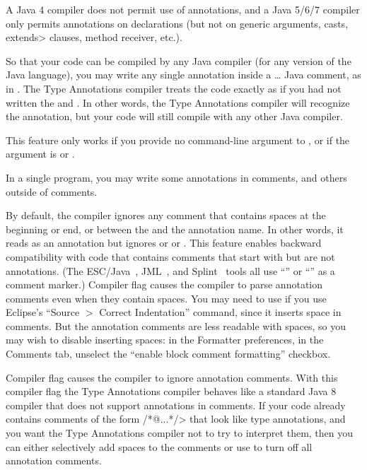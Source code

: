 A Java 4 compiler does not permit use of
annotations, and a Java 5/6/7 compiler only permits annotations on
declarations (but not on generic arguments, casts, \<extends> clauses, method receiver, etc.).

So that your code can be compiled by any Java compiler (for any version of
the Java language), you may write any single annotation inside a
\code{/*}\ldots\code{*/} Java comment, as in .
The Type Annotations compiler treats the code exactly as if you had not written the
\code{/*} and \code{*/}.
In other words, the Type Annotations compiler will recognize the
annotation, but your code will still compile with any other Java compiler.

This feature only works if you provide no  command-line
argument to , or if the  argument is 
or .

In a single program, you may write some annotations in comments, and others
outside of comments.

By default, the compiler ignores any comment that contains spaces at the
beginning or end, or between the  and the annotation name.
In other words, it reads  as an annotation but ignores
 or  or .
This
feature enables backward compatibility with code that contains comments
that start with  but are not annotations.  (The
ESC/Java~\cite{FlanaganLLNSS02}, JML~\cite{LeavensBR2006:JML}, and
Splint~\cite{Evans96} tools all use ``'' or ``'' as a
comment marker.)
Compiler flag
 causes the compiler to parse annotation comments
even when they contain spaces.  You may need to use
 if you use Eclipse's ``Source $>$ Correct
Indentation'' command, since it inserts space in comments.  But the
annotation comments are less readable with spaces, so you may wish to disable
inserting spaces:  in the Formatter preferences, in the Comments tab,
unselect the ``enable block comment formatting'' checkbox.

Compiler flag  causes the compiler
to ignore annotation comments.  With this compiler flag the Type
Annotations compiler behaves like a standard Java 8 compiler that does
not support annotations in comments.  If your code already contains
comments of the form \</*@...*/> that look like type annotations, and
you want the Type Annotations compiler not to try to interpret them,
then you can either selectively add spaces to the comments or use
 to turn off all annotation
comments.

